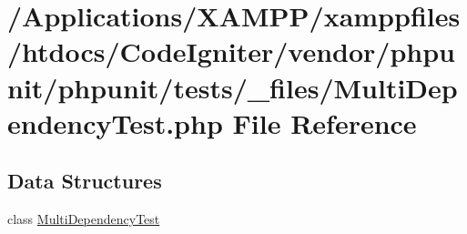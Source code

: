 \hypertarget{_multi_dependency_test_8php}{}\section{/\+Applications/\+X\+A\+M\+P\+P/xamppfiles/htdocs/\+Code\+Igniter/vendor/phpunit/phpunit/tests/\+\_\+files/\+Multi\+Dependency\+Test.php File Reference}
\label{_multi_dependency_test_8php}
\subsection*{Data Structures}
\begin{DoxyCompactItemize}
\item 
class \mbox{\hyperlink{class_multi_dependency_test}{Multi\+Dependency\+Test}}
\end{DoxyCompactItemize}
